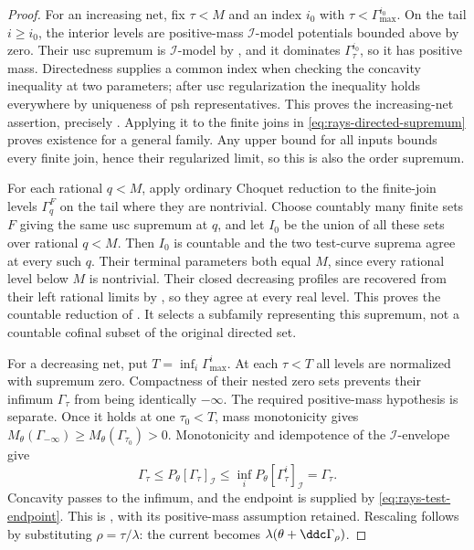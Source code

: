 \begin{proof}
For an increasing net, fix $\tau<M$ and an index $i_0$ with
$\tau<\Gamma^{i_0}_{\max}$.
On the tail $i\geq i_0$, the interior levels are positive-mass
$\mathcal I$-model potentials bounded above by zero.
Their usc supremum is $\mathcal I$-model by
\cite[Proposition~3.2.13]{XiaBook}, and it dominates
$\Gamma^{i_0}_\tau$, so it has positive mass.
Directedness supplies a common index when checking the concavity
inequality at two parameters; after usc regularization the inequality
holds everywhere by uniqueness of psh representatives.
This proves the increasing-net assertion, precisely
\cite[Proposition~9.4.3]{XiaBook}.
Applying it to the finite joins in
\eqref{eq:rays-directed-supremum} proves existence for a general family.
Any upper bound for all inputs bounds every finite join, hence their
regularized limit, so this is also the order supremum.

For each rational $q<M$, apply ordinary Choquet reduction to the
finite-join levels $\Gamma^F_q$ on the tail where they are nontrivial.
Choose countably many finite sets $F$ giving the same usc supremum
at $q$, and let $I_0$ be the union of all these sets over rational $q<M$.
Then $I_0$ is countable and the two test-curve suprema agree at every
such $q$. Their terminal parameters both equal $M$, since every
rational level below $M$ is nontrivial.
Their closed decreasing profiles are recovered from their left
rational limits by , so they agree at
every real level.
This proves the countable reduction of
\cite[Proposition~9.4.5]{XiaBook}.
It selects a subfamily representing this supremum, not a countable
cofinal subset of the original directed set.


For a decreasing net, put $T=\inf_i\Gamma^i_{\max}$.
At each $\tau<T$ all levels are normalized with supremum zero.
Compactness of their nested zero sets prevents their infimum
$\Gamma_\tau$ from being identically $-\infty$.
The required positive-mass hypothesis is separate.
Once it holds at one $\tau_0<T$, mass monotonicity gives
$M_\theta(\Gamma_{-\infty})\geq M_\theta(\Gamma_{\tau_0})>0$.
Monotonicity and idempotence of the $\mathcal I$-envelope give
\[
 \Gamma_\tau\leq P_\theta[\Gamma_\tau]_{\mathcal I}
       \leq\inf_iP_\theta[\Gamma^i_\tau]_{\mathcal I}
       =\Gamma_\tau.
\]
Concavity passes to the infimum, and the endpoint is supplied
by \eqref{eq:rays-test-endpoint}.
This is \cite[Lemma~2.8]{DXZ23}, with its positive-mass
assumption retained.
Rescaling follows by substituting $\rho=\tau/\lambda$:
the current becomes $\lambda(\theta+\ddc\Gamma_\rho)$.


\end{proof}

